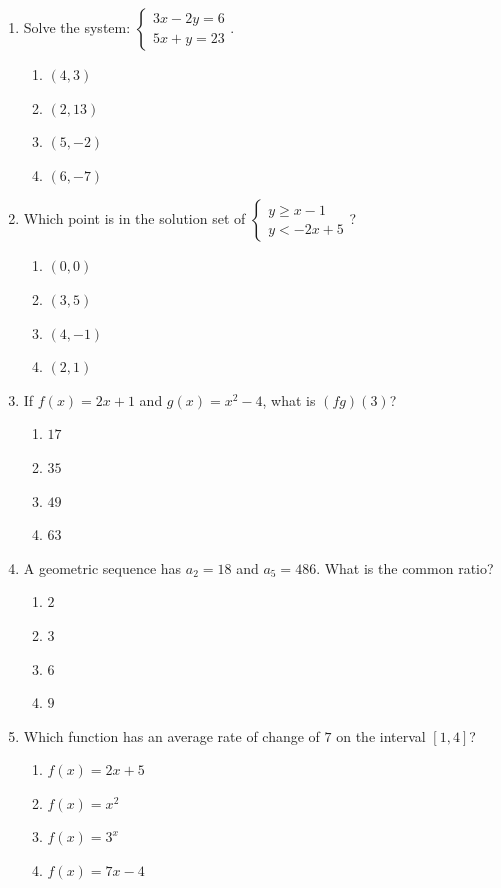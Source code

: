 \documentclass[11pt]{article}
\begin{document}
\begin{enumerate}
\item Solve the system: $\begin{cases}3x-2y=6\\5x+y=23\end{cases}$.
\begin{enumerate}[label=(\Alph*)]
\item $(4,3)$ \item $(2,13)$ \item $(5,-2)$ \item $(6,-7)$
\end{enumerate}

\item Which point is in the solution set of $\begin{cases}y\geq x-1\\y< -2x+5\end{cases}$?
\begin{enumerate}[label=(\Alph*)]
\item $(0,0)$ \item $(3,5)$ \item $(4,-1)$ \item $(2,1)$
\end{enumerate}

\item If $f(x)=2x+1$ and $g(x)=x^2-4$, what is $(fg)(3)$?
\begin{enumerate}[label=(\Alph*)]
\item $17$ \item $35$ \item $49$ \item $63$
\end{enumerate}

\item A geometric sequence has $a_2=18$ and $a_5=486$. What is the common ratio?
\begin{enumerate}[label=(\Alph*)]
\item $2$ \item $3$ \item $6$ \item $9$
\end{enumerate}

\item Which function has an average rate of change of $7$ on the interval $[1,4]$?
\begin{enumerate}[label=(\Alph*)]
\item $f(x)=2x+5$ \item $f(x)=x^2$ \item $f(x)=3^x$ \item $f(x)=7x-4$
\end{enumerate}


\end{enumerate}
\end{document}
